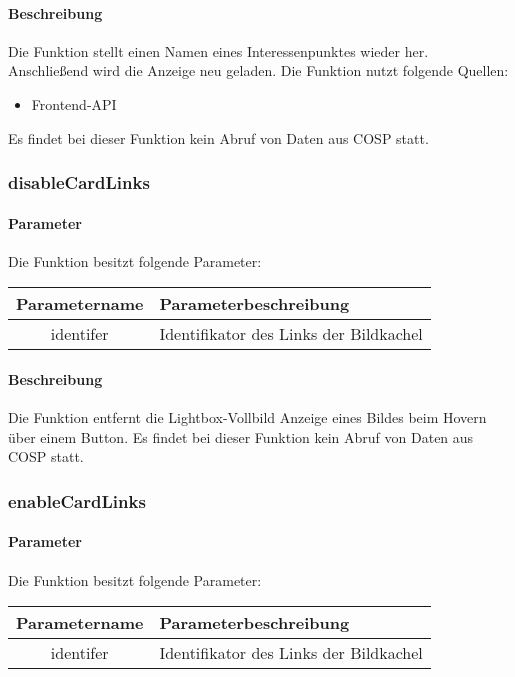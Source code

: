 \paragraph{Beschreibung} Die Funktion stellt einen Namen eines Interessenpunktes wieder her. Anschließend wird die Anzeige neu geladen. Die Funktion nutzt folgende Quellen:
\begin{itemize}
	\item Frontend-API
\end{itemize}
Es findet bei dieser Funktion kein Abruf von Daten aus {\glqq COSP\grqq} statt.
\subsubsection{disableCardLinks}
\paragraph{Parameter} Die Funktion besitzt folgende Parameter:
\begin{table}[H]
	\begin{tabular}{|c|p{11cm}|}
		\hline
		\textbf{Parametername} & \textbf{Parameterbeschreibung} \\ \hline
		identifer & Identifikator des Links der Bildkachel \\ \hline
	\end{tabular}
\end{table}
\paragraph{Beschreibung} Die Funktion entfernt die Lightbox-Vollbild Anzeige eines Bildes beim Hovern über einem Button. Es findet bei dieser Funktion kein Abruf von Daten aus {\glqq COSP\grqq} statt.
\subsubsection{enableCardLinks}
\paragraph{Parameter} Die Funktion besitzt folgende Parameter:
\begin{table}[H]
	\begin{tabular}{|c|p{11cm}|}
		\hline
		\textbf{Parametername} & \textbf{Parameterbeschreibung} \\ \hline
		identifer & Identifikator des Links der Bildkachel \\ \hline
	\end{tabular}
\end{table}
